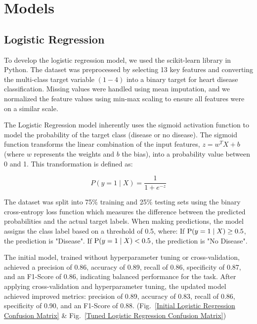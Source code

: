 \section{Models}

\subsection{Logistic Regression}
To develop the logistic regression model, we used the scikit-learn library in Python. The dataset was preprocessed by selecting 13 key features and converting the multi-class target variable $(1 - 4)$ into a binary target for heart disease classification. Missing values were handled using mean imputation, and we normalized the feature values using min-max scaling to ensure all features were on a similar scale.

The Logistic Regression model inherently uses the sigmoid activation function to model the probability of the target class (disease or no disease). The sigmoid function transforms the linear combination of the input features, $z = w^{T}X + b$ (where \(w\) represents the weights and \(b\) the bias), into a probability value between 0 and 1. This transformation is defined as:

\[
P(y=1 \mid X) = \frac{1}{1 + e^{-z}}
\]

The dataset was split into 75\% training and 25\% testing sets using the binary cross-entropy loss function which measures the difference between the predicted probabilities and the actual target labels. When making predictions, the model assigns the class label based on a threshold of 0.5, where: 
If $\textnormal{P}(y=1 \mid X) \geq 0.5$,  the prediction is "Disease".
If $\textnormal{P}(y=1 \mid X) < 0.5$, the prediction is "No Disease".

The initial model, trained without hyperparameter tuning or cross-validation, achieved a precision of 0.86, accuracy of 0.89, recall of 0.86, specificity of 0.87, and an F1-Score of 0.86, indicating balanced performance for the task. After applying cross-validation and hyperparameter tuning, the updated model achieved improved metrics: precision of 0.89, accuracy of 0.83, recall of 0.86, specificity of 0.90, and an F1-Score of 0.88. (Fig.~\ref{Initial Logistic Regression Confusion Matrix} \& Fig.~\ref{Tuned Logistic Regression Confusion Matrix})

